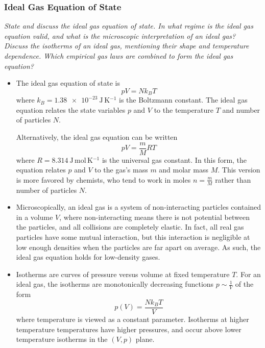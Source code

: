 \documentclass[11pt, a4paper]{article}
\begin{document}
\subsubsection{Ideal Gas Equation of State}
\textit{State and discuss the ideal gas equation of state. In what regime is the ideal gas equation valid, and what is the microscopic interpretation of an ideal gas? Discuss the isotherms of an ideal gas, mentioning their shape and temperature dependence. Which empirical gas laws are combined to form the ideal gas equation?}
\begin{itemize}
	\item The ideal gas equation of state is
	\begin{equation*}
		pV = N k_{B} T
	\end{equation*}
	where $ k_{B} = \SI{1.38e-23}{\joule \, \kelvin^{-1}} $ is the Boltzmann constant. The ideal gas equation relates the state variables $ p $ and $ V $ to the temperature $ T $ and number of particles $ N $. 
	
	Alternatively, the ideal gas equation can be written
	\begin{equation*}
		pV = \frac{m}{M}RT
	\end{equation*}
	where $ R = \SI{8.314}{\joule \, \mole \, \kelvin^{-1}} $ is the universal gas constant. In this form, the equation relates $ p $ and $ V $ to the gas's mass $ m $ and molar mass $ M $. This version is more favored by chemists, who tend to work in moles $ n = \frac{m}{M} $ rather than number of particles $ N $.
	
	\item Microscopically, an ideal gas is a system of non-interacting particles contained in a volume $ V $, where non-interacting means there is not potential between the particles, and all collisions are completely elastic. In fact, all real gas particles have some mutual interaction, but this interaction is negligible at low enough densities when the particles are far apart on average. As such, the ideal gas equation holds for low-density gases.
	
	\item Isotherms are curves of pressure versus volume at fixed temperature $ T $. For an ideal gas, the isotherms are monotonically decreasing functions $ p \sim \frac{1}{V} $ of the form
	\begin{equation*}
		p(V) = \frac{Nk_{B}T}{V}
	\end{equation*}
	where temperature is viewed as a constant parameter. Isotherms at higher temperature temperatures have higher pressures, and occur above lower temperature isotherms in the $ (V, p) $ plane.
	

\end{itemize}
\end{document}
